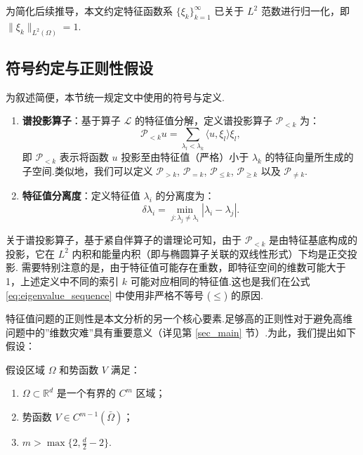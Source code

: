 为简化后续推导，本文约定特征函数系 $\{\xi_{k}\}_{k=1}^{\infty}$ 已关于 $L^{2}$ 范数进行归一化，即 $\|\xi_{k}\|_{L^{2}(\Omega)}=1$.


\subsection{符号约定与正则性假设}

为叙述简便，本节统一规定文中使用的符号与定义.

\begin{definition}[基础符号与算子]\label{def:notation}
\quad
\begin{enumerate}
    \item \textbf{谱投影算子}：基于算子 $\mathcal{L}$ 的特征值分解，定义谱投影算子 $\mathcal{P}_{<k}$ 为：
    \begin{equation*}
        \mathcal{P}_{<k}u = \sum_{\lambda_{l}<\lambda_{k}} \langle u,\xi_{l} \rangle \xi_{l},
    \end{equation*}
    即 $\mathcal{P}_{<k}$ 表示将函数 $u$ 投影至由特征值（严格）小于 $\lambda_k$ 的特征向量所生成的子空间.类似地，我们可以定义 $\mathcal{P}_{>k}$, $\mathcal{P}_{=k}$, $\mathcal{P}_{\leq k}$, $\mathcal{P}_{\geq k}$ 以及 $\mathcal{P}_{\neq k}$.
    
    \item \textbf{特征值分离度}：定义特征值 $\lambda_i$ 的分离度为：
    \begin{equation*}
        \delta \lambda_{i} = \min_{j: \lambda_{j}\neq \lambda_{i}} |\lambda_{i}-\lambda_{j}|.
    \end{equation*}
\end{enumerate}
\end{definition}

关于谱投影算子，基于紧自伴算子的谱理论可知，由于 $\mathcal{P}_{<k}$ 是由特征基底构成的投影，它在 $L^{2}$ 内积和能量内积（即与椭圆算子关联的双线性形式）下均是正交投影.
需要特别注意的是，由于特征值可能存在重数，即特征空间的维数可能大于 1，上述定义中不同的索引 $k$ 可能对应相同的特征值.这也是我们在公式 \eqref{eq:eigenvalue_sequence} 中使用非严格不等号 ($\leq$) 的原因.

特征值问题的正则性是本文分析的另一个核心要素.足够高的正则性对于避免高维问题中的”维数灾难”具有重要意义（详见第 \ref{sec_main} 节）.为此，我们提出如下假设：

\begin{assumption}[正则性假设]\label{ass:regularity}
假设区域 $\Omega$ 和势函数 $V$ 满足：
\begin{enumerate}
    \item[(a)] $\Omega \subset \mathbb{R}^d$ 是一个有界的 $C^{m }$ 区域；
    \item[(b)] 势函数 $V \in C^{m-1}(\bar{\Omega})$；
    \item[(c)] $m > \max\{2, \frac{d}{2}-2\}$.
\end{enumerate}
\end{assumption}

